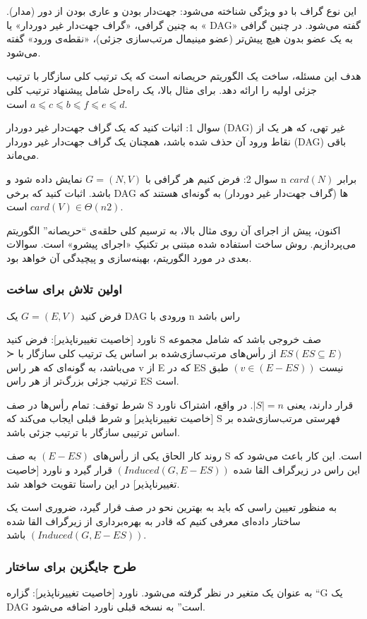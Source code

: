 \documentclass{book} %
\begin{document}
این نوع گراف با دو ویژگی شناخته می‌شود: جهت‌دار بودن و عاری بودن از دور
(مدار). به چنین گرافی، «گراف جهت‌دار غیر دوردار» یا « DAG» گفته می‌شود. در چنین
گرافی به یک عضو بدون هیچ پیش‌تر (عضو مینیمال مرتب‌سازی جزئی)، «نقطه‌ی ورود»
گفته می‌شود.

هدف این مسئله، ساخت یک الگوریتم حریصانه است که یک ترتیب کلی سازگار با ترتیب جزئی اولیه را ارائه دهد. برای مثال بالا، یک راه‌حل شامل پیشنهاد ترتیب کلی $a ⩽ c ⩽ b ⩽ f ⩽ e ⩽ d$ است.

سوال 1: اثبات کنید که یک گراف جهت‌دار غیر دوردار (DAG) غیر تهی، که هر یک از نقاط ورود آن حذف
شده باشد، همچنان یک گراف جهت‌دار غیر دوردار (DAG) باقی می‌ماند.


سوال 2: فرض کنیم هر گرافی با $G = (N, V)$ نمایش داده شود و n برابر $card(N)$ باشد.
اثبات کنید که برخی DAG ها (گراف جهت‌دار غیر دوردار) به گونه‌ای هستند که $card(V) ∈ Θ(n2)$
است.

اکنون، پیش از اجرای آن روی مثال بالا، به ترسیم کلی حلقه‌ی “حریصانه” الگوریتم می‌پردازیم.
روش ساخت استفاده شده مبتنی بر تکنیکِ «اجرای پیشرو» است. سوالات بعدی در مورد
الگوریتم، بهینه‌سازی و پیچیدگی آن خواهد بود.

\newpage

\subsubsection*{اولین تلاش برای ساخت}
فرض کنید $G = (E, V)$ یک DAG ورودی با n راس باشد

ناورد [خاصیت تغییرناپذیر]: فرض کنید S صف خروجی باشد که شامل مجموعه $ES (ES ⊆ E)$ از رأس‌های مرتب‌سازی‌شده بر اساس یک ترتیب کلی سازگار با ≺  می‌باشد، به گونه‌ای که هر راس v از E که در ES نیست $(v ∈ (E−ES ))$ طبق ترتیب جزئی بزرگ‌تر از هر راس ES است.

شرط توقف: تمام رأس‌ها در صف S قرار دارند، یعنی $|S| = n$.
در واقع، اشتراک ناورد [خاصیت تغییرناپذیر] و شرط قبلی ایجاب می‌کند که S
فهرستی مرتب‌سازی‌شده بر اساس ترتیبی سازگار با ترتیب جزئی باشد.

روند کار الحاق یکی از رأس‌های $(E − ES )$ به صف S است.
این کار باعث می‌شود که این راس در زیرگراف القا شده $(Induced(G, E − ES ))$ قرار گیرد
و ناورد [خاصیت تغییرناپذیر] در این راستا تقویت خواهد شد.

به منظور تعیین راسی که باید به بهترین نحو در صف قرار گیرد، ضروری است یک ساختار
داده‌ای معرفی کنیم که قادر به بهره‌برداری از زیرگراف القا شده $(Induced(G, E − ES ))$ باشد.

\subsubsection*{طرح جایگزین برای ساختار}
به عنوان یک متغیر در نظر گرفته می‌شود.
ناورد [خاصیت تغییرناپذیر]: گزاره “G یک DAG است” به نسخه قبلی ناورد اضافه می‌شود.
\end{document}
